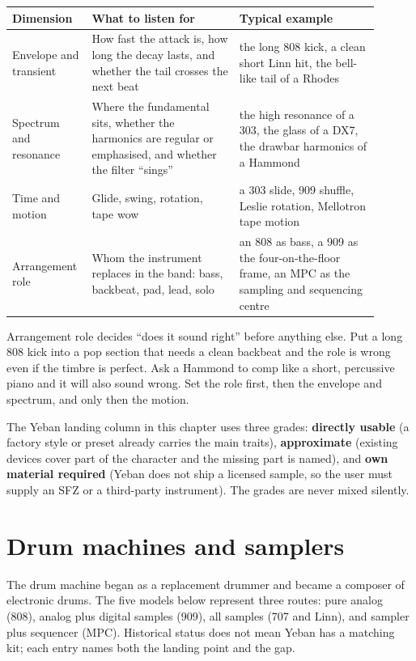 \begin{longtable}{p{0.16\linewidth}p{0.38\linewidth}p{0.36\linewidth}}
\hline
Dimension & What to listen for & Typical example \\
\hline
\endhead
Envelope and transient & How fast the attack is, how long the decay lasts,
and whether the tail crosses the next beat & the long 808 kick, a clean
short Linn hit, the bell-like tail of a Rhodes \\
Spectrum and resonance & Where the fundamental sits, whether the harmonics
are regular or emphasised, and whether the filter ``sings'' & the high
resonance of a 303, the glass of a DX7, the drawbar harmonics of a Hammond \\
Time and motion & Glide, swing, rotation, tape wow & a 303 slide, 909 shuffle,
Leslie rotation, Mellotron tape motion \\
Arrangement role & Whom the instrument replaces in the band: bass, backbeat,
pad, lead, solo & an 808 as bass, a 909 as the four-on-the-floor frame,
an MPC as the sampling and sequencing centre \\
\hline
\end{longtable}

Arrangement role decides ``does it sound right'' before anything else. Put a
long 808 kick into a pop section that needs a clean backbeat and the role is
wrong even if the timbre is perfect. Ask a Hammond to comp like a short,
percussive piano and it will also sound wrong. Set the role first, then the
envelope and spectrum, and only then the motion.

The Yeban landing column in this chapter uses three grades:
\textbf{directly usable} (a factory style or preset already carries the main
traits), \textbf{approximate} (existing devices cover part of the character
and the missing part is named), and \textbf{own material required} (Yeban
does not ship a licensed sample, so the user must supply an SFZ or a
third-party instrument). The grades are never mixed silently.

\section{Drum machines and samplers}
\label{sec:iconic-drum-machines}

The drum machine began as a replacement drummer and became a composer of
electronic drums. The five models below represent three routes: pure analog
(808), analog plus digital samples (909), all samples (707 and Linn), and
sampler plus sequencer (MPC). Historical status does not mean Yeban has a
matching kit; each entry names both the landing point and the gap.


